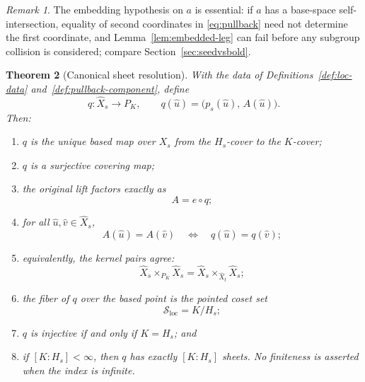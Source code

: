\documentclass[11pt,reqno]{amsart}
\newtheorem{theorem}{Theorem}[section]
\theoremstyle{definition}
\theoremstyle{remark}
\newtheorem{remark}[theorem]{Remark}
\begin{document}
\begin{remark}
The embedding hypothesis on \( a \) is essential: if \( a \) has a
base-space self-intersection, equality of second coordinates in
\eqref{eq:pullback} need not determine the first coordinate, and
Lemma~\ref{lem:embedded-leg} can fail before any subgroup collision is
considered; compare Section~\ref{sec:seedvsbold}.
\end{remark}
\begin{theorem}[Canonical sheet resolution]\label{thm:sheet-resolution}
With the data of Definitions~\ref{def:loc-data} and~\ref{def:pullback-component}, define
\begin{equation}\label{eq:q-def}
  q\colon\widehat X_s\longrightarrow P_K,
  \qquad
  q(\widehat u)=\bigl(p_s(\widehat u),\,A(\widehat u)\bigr).
\end{equation}
Then:
\begin{enumerate}
\item \( q \) is the unique based map over \( X_s \) from the \( H_s \)-cover to the \( K \)-cover;
\item \( q \) is a surjective covering map;
\item the original lift factors exactly as
\begin{equation}\label{eq:factorization}
  A=e\circ q;
\end{equation}
\item for all \( \widehat u,\widehat v\in\widehat X_s \),
\begin{equation}\label{eq:kernel-equiv}
  A(\widehat u)=A(\widehat v)
  \quad\Longleftrightarrow\quad
  q(\widehat u)=q(\widehat v);
\end{equation}
\item equivalently, the kernel pairs agree:
\begin{equation}\label{eq:kernel-pair}
  \widehat X_s\times_{P_K}\widehat X_s
  =
  \widehat X_s\times_{\widehat X_t}\widehat X_s;
\end{equation}
\item the fiber of \( q \) over the based point is the pointed coset set
\begin{equation}\label{eq:sheet-fiber}
  \mathcal S_{\mathrm{loc}}=K/H_s;
\end{equation}
\item \( q \) is injective if and only if \( K=H_s \); and
\item if \( [K:H_s]<\infty \), then \( q \) has exactly \( [K:H_s] \) sheets.  No finiteness is asserted when the index is infinite.
\end{enumerate}
\end{theorem}
\end{document}
